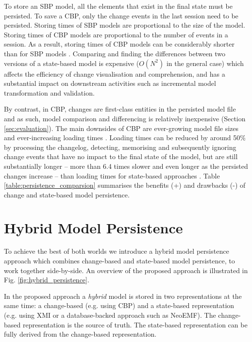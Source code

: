 \documentclass{llncs}
\begin{document}
To store an SBP model, all the elements that exist in the final state must be persisted. To save a CBP, only the change events in the last session need to be persisted. Storing times of SBP models are proportional to the size of the model. Storing times of CBP models are proportional to the number of events in a session. As a result, storing times of CBP models can be considerably shorter than for SBP models \cite{yohannis2018towards}. Comparing and finding the differences between two versions of a state-based model is expensive \cite{Kolovos:2009:DMM:1564596.1564641} ($O(N^2)$ in the general case) which affects the efficiency of change visualisation and comprehension, and has a substantial impact on downstream activities such as incremental model transformation \cite{DBLP:conf/ecmdafa/OgunyomiRK15} and validation.

By contrast, in CBP, changes are first-class entities in the persisted model file and as such, model comparison and differencing is relatively inexpensive (Section \ref{sec:evaluation}). The main downsides of CBP are ever-growing model file sizes \cite{DBLP:journals/entcs/RobbesL07,DBLP:conf/edoc/KoegelHLHD10} and ever-increasing loading times \cite{mens2002state}. Loading times can be reduced by around 50\% by processing the changelog, detecting, memorising and subsequently ignoring change events that have no impact to the final state of the model, but are still substantially longer -- more than 6.4 times slower and even longer as the persisted changes increase -- than loading times for state-based approaches \cite{yohannis2018towards}. Table \ref{table:persistence_comparsion} summarises the benefits (+) and drawbacks (-) of change and state-based model persistence.

\vspace{-20pt}
\section{Hybrid Model Persistence}
\label{sec:hybrid_model_persistence}

\vspace{-15pt}
To achieve the best of both worlds we introduce a hybrid model persistence approach which combines change-based and state-based model persistence, to work together side-by-side. An overview of the proposed approach is illustrated in Fig. \ref{fig:hybrid_persistence}.

In the proposed approach a \textit{hybrid} model is stored in two representations at the same time: a change-based (e.g. using CBP) and a state-based representation (e.g. using XMI or a database-backed approach such as NeoEMF). The change-based representation is the source of truth. The state-based representation can be fully derived from the change-based representation.
\end{document}
